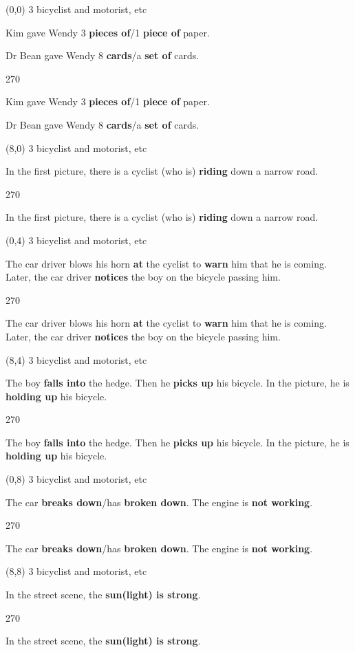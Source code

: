 \documentclass[a4paper]{article}
\newenvironment{itemize*}%
{\begin{itemize}%
 \setlength{\itemsep}{0.0cm}%
 \setlength{\parsep}{0pt}%
 \setlength{\parskip}{0pt}}%
{\end{itemize}}
\newcommand{\mycard}[3]{%
	\small #1 #2
	\par
	\parbox[t][6.8cm][c]{9.5cm}{%
	\par
	\myleft{#3}
	\par
	\myright{#3}
	}
}
\newcommand{\myleft}[1]{%
	\begin{sideways}
	\hspace*{-0.9cm}
		\parbox[t][2.7cm][t]{6.5cm}{%
		\large #1
		}
	\end{sideways}
}
\newcommand{\myright}[1]{%
	\hspace*{6.5cm}
	\begin{turn}{270}
	\hspace*{-7.1cm}
		\parbox[t][2.7cm][t]{6.5cm}{%
		\large #1
		}
	\end{turn}
}
\begin{document}
\begin{textblock}{8}(0,0)
\mycard{3}{bicyclist and motorist, etc}{
\begin{itemize*}
\item Kim gave Wendy 3 \textbf{pieces of}/1 \textbf{piece of} paper.
\item Dr Bean gave Wendy 8 \textbf{cards}/a \textbf{set of} cards.
\end{itemize*}
}
\end{textblock}

\begin{textblock}{8}(8,0)
\mycard{3}{bicyclist and motorist, etc}{
\begin{itemize*}
\item In the first picture, there is a cyclist (who is) \textbf{riding} down a narrow road.
\end{itemize*}
}
\end{textblock}

\begin{textblock}{8}(0,4)
\mycard{3}{bicyclist and motorist, etc}{
\begin{itemize*}
\item The car driver blows his horn \textbf{at} the cyclist to \textbf{warn} him that he is coming. Later, the car driver \textbf{notices} the boy on the bicycle passing him.
\end{itemize*}
}
\end{textblock}

\begin{textblock}{8}(8,4)
\mycard{3}{bicyclist and motorist, etc}{
\begin{itemize*}
\item The boy \textbf{falls into} the hedge. Then he \textbf{picks up} his bicycle. In the picture, he is \textbf{holding up} his bicycle.
\end{itemize*}
}
\end{textblock}

\begin{textblock}{8}(0,8)
\mycard{3}{bicyclist and motorist, etc}{
\begin{itemize*}
\item The car \textbf{breaks down}/has \textbf{broken down}. The engine is \textbf{not working}.
\end{itemize*}
}
\end{textblock}

\begin{textblock}{8}(8,8)
\mycard{3}{bicyclist and motorist, etc}{
\begin{itemize*}
\item In the street scene, the \textbf{sun(light) is strong}.
\end{itemize*}
}
\end{textblock}
\end{document}
